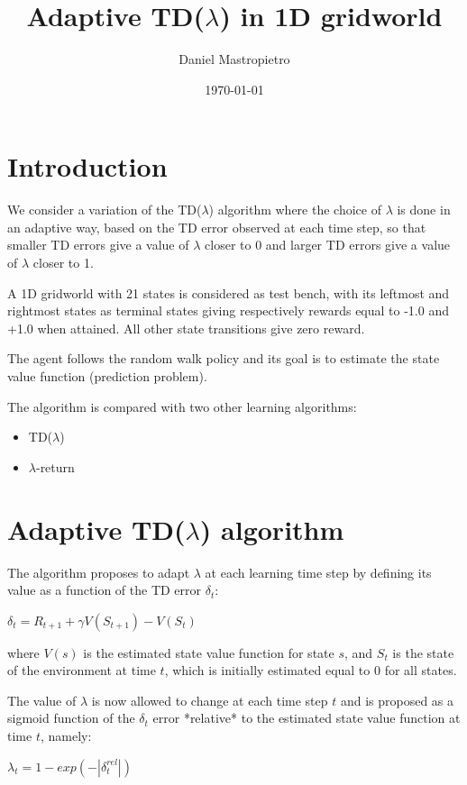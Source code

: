 \documentclass[11pt,A4paper]{article}
\author{Daniel Mastropietro}
\title{Adaptive TD($\lambda$) in 1D gridworld}
\date{\today}
\begin{document}
\maketitle

\section{Introduction}

We consider a variation of the TD($\lambda$) algorithm where the choice of $\lambda$ is done in an adaptive way, based on the TD error observed at each time step, so that smaller TD errors give a value of $\lambda$ closer to 0 and larger TD errors give a value of $\lambda$ closer to 1.

A 1D gridworld with 21 states is considered as test bench, with its leftmost and rightmost states as terminal states giving respectively rewards equal to -1.0 and +1.0 when attained. All other state transitions give zero reward.

The agent follows the random walk policy and its goal is to estimate the state value function (prediction problem).

The algorithm is compared with two other learning algorithms:
\begin{itemize}
\item TD($\lambda$)
\item $\lambda$-return
\end{itemize}

\section{Adaptive TD($\lambda$) algorithm}

The algorithm proposes to adapt $\lambda$ at each learning time step by defining its value as a function of the TD error $\delta_t$:  

\medskip
$\delta_t = R_{t+1} + \gamma V(S_{t+1}) - V(S_t)$
\medskip

where $V(s)$ is the estimated state value function for state $s$, and $S_t$ is the state of the environment at time $t$, which is initially estimated equal to 0 for all states.

The value of $\lambda$ is now allowed to change at each time step $t$ and is proposed as a sigmoid function of the $\delta_t$ error *relative* to the estimated state value function at time $t$, namely:  

\medskip
$\lambda_t = 1 - exp(- |\delta^{rel}_t| )$  
\medskip
\end{document}
